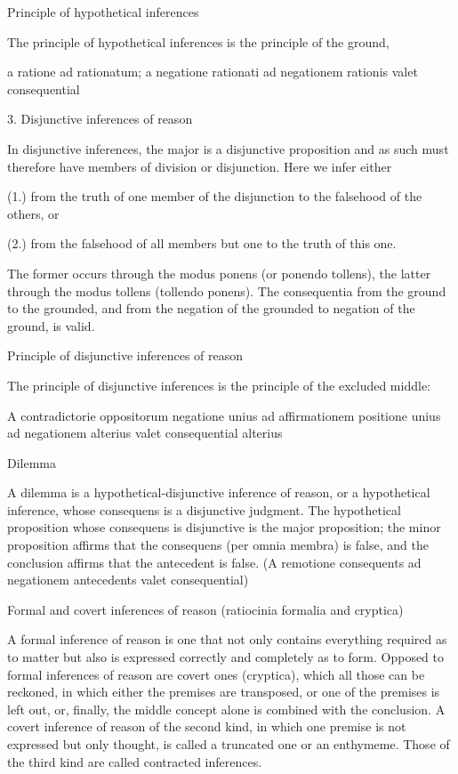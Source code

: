 Principle of hypothetical inferences

The principle of hypothetical inferences is
the principle of the ground,

a ratione ad rationatum;
a negatione rationati ad negationem rationis valet consequential

3. Disjunctive inferences of reason

In disjunctive inferences, the major is a disjunctive proposition
and as such must therefore have members of division or disjunction.
Here we infer either

(1.)    from the truth of one member of the disjunction
        to the falsehood of the others, or

(2.)    from the falsehood of all members but one
        to the truth of this one.

The former occurs through the modus ponens (or ponendo tollens),
the latter through the modus tollens (tollendo ponens).
The consequentia from the ground to the grounded,
and from the negation of the grounded to negation of the ground, is valid.

Principle of disjunctive inferences of reason

The principle of disjunctive inferences is
the principle of the excluded middle:

A contradictorie oppositorum negatione unius ad affirmationem
positione unius ad negationem alterius valet consequential alterius

Dilemma

A dilemma is a hypothetical-disjunctive inference of reason,
or a hypothetical inference, whose consequens is a disjunctive judgment.
The hypothetical proposition whose consequens is disjunctive
is the major proposition;
the minor proposition affirms that the consequens
(per omnia membra) is false,
and the conclusion affirms that the antecedent is false.
(A remotione consequents ad negationem antecedents valet consequential)

Formal and covert inferences of reason
(ratiocinia formalia and cryptica)

A formal inference of reason is one that not only contains everything
required as to matter but also is expressed correctly
and completely as to form.
Opposed to formal inferences of reason are covert ones (cryptica),
which all those can be reckoned,
in which either the premises are transposed,
or one of the premises is left out, or, finally,
the middle concept alone is combined with the conclusion.
A covert inference of reason of the second kind,
in which one premise is not expressed but only thought,
is called a truncated one or an enthymeme.
Those of the third kind are called contracted inferences.

